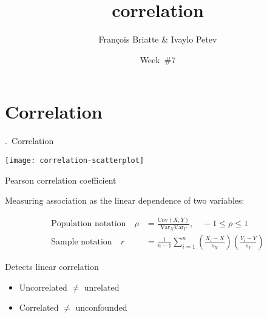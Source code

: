\documentclass[t]{beamer}
\title{correlation}
\author{François Briatte \& Ivaylo Petev}
\date{Week~\#7}
\begin{document}
	
	
	\section{Correlation}
	
    \begin{frame}[c]{\thesection.~Correlation}
	
		\begin{center}
			\texttt{[image: correlation-scatterplot]}
		\end{center}
				
	\end{frame}
	
	\begin{frame}{Pearson correlation coefficient}
	
		\begin{block}{Measuring association as the linear dependence of two variables:}
		
			\begin{align*}
				\text{Population notation} \quad
				\rho &= \frac{\text{Cov}(X,Y)}{\text{Var}_X\text{Var}_Y}, \quad
				-1 \leq \rho \leq 1
				\\
				\text{Sample notation} \quad
				r &= \frac{1}{n-1} \sum ^n _{i=1} (\frac{X_i - \bar{X}}{s_X}) (\frac{Y_i - \bar{Y}}{s_Y})
			\end{align*}

		\end{block}
		
		\begin{alertblock}{Detects linear correlation}

			\begin{itemize}
				\item Uncorrelated $\neq$ unrelated
				\item Correlated $\neq$ unconfounded
			\end{itemize}
						
		\end{alertblock}
					
	\end{frame}
\end{document}
